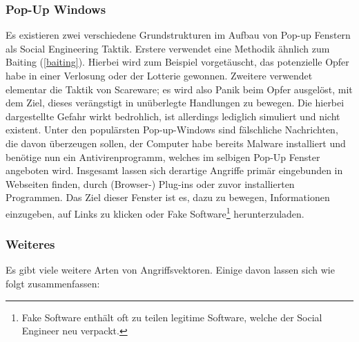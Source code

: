 \subsubsection{Pop-Up Windows}
Es existieren zwei verschiedene Grundstrukturen im Aufbau von Pop-up Fenstern als Social Engineering Taktik. Erstere verwendet eine Methodik ähnlich zum Baiting (\autoref{baiting}).
Hierbei wird zum Beispiel vorgetäuscht, das potenzielle Opfer habe in einer Verlosung oder der Lotterie gewonnen.
Zweitere verwendet elementar die Taktik von Scareware; es wird also Panik beim Opfer ausgelöst, mit dem Ziel, dieses verängstigt in unüberlegte Handlungen zu bewegen. Die hierbei
dargestellte Gefahr wirkt bedrohlich, ist allerdings lediglich simuliert und nicht existent. Unter den populärsten Pop-up-Windows sind fälschliche Nachrichten, die davon
überzeugen sollen, der Computer habe bereits Malware installiert und benötige nun ein Antivirenprogramm, welches im selbigen Pop-Up Fenster angeboten wird.
Insgesamt lassen sich derartige Angriffe primär eingebunden in Webseiten finden, durch (Browser-) Plug-ins oder
zuvor installierten Programmen. Das Ziel dieser Fenster ist es, dazu zu bewegen, Informationen einzugeben, auf Links zu klicken oder Fake Software\footnote{Fake Software enthält oft zu teilen legitime Software, welche der Social Engineer neu verpackt.} herunterzuladen.

\subsubsection{Weiteres}
Es gibt viele weitere Arten von Angriffsvektoren. Einige davon lassen sich wie folgt zusammenfassen:

